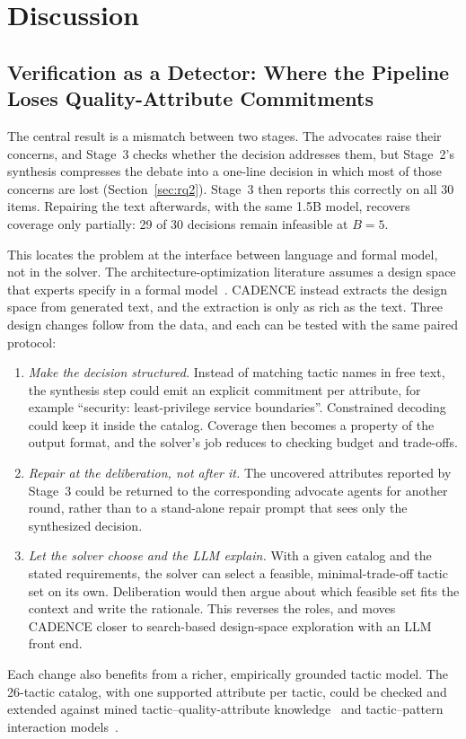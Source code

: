 \documentclass[preprint,12pt,authoryear]{elsarticle}
\renewcommand{\_}{\textunderscore\allowbreak{}}
\begin{document}
\section{Discussion}
\label{sec:discussion}

\subsection{Verification as a Detector: Where the Pipeline Loses Quality-Attribute Commitments}

The central result is a mismatch between two stages. The advocates raise their concerns, and Stage~3 checks whether the decision addresses them, but Stage~2's synthesis compresses the debate into a one-line decision in which most of those concerns are lost (Section~\ref{sec:rq2}). Stage~3 then reports this correctly on all 30 items. Repairing the text afterwards, with the same 1.5B model, recovers coverage only partially: 29 of 30 decisions remain infeasible at $B=5$.

This locates the problem at the interface between language and formal model, not in the solver. The architecture-optimization literature assumes a design space that experts specify in a formal model~\citep{aleti2013,martens2010,koziolek2011peropteryx}. CADENCE instead extracts the design space from generated text, and the extraction is only as rich as the text. Three design changes follow from the data, and each can be tested with the same paired protocol:
\begin{enumerate}[leftmargin=*]
\item \emph{Make the decision structured.} Instead of matching tactic names in free text, the synthesis step could emit an explicit commitment per attribute, for example ``security: least-privilege service boundaries''. Constrained decoding could keep it inside the catalog. Coverage then becomes a property of the output format, and the solver's job reduces to checking budget and trade-offs.
\item \emph{Repair at the deliberation, not after it.} The uncovered attributes reported by Stage~3 could be returned to the corresponding advocate agents for another round, rather than to a stand-alone repair prompt that sees only the synthesized decision.
\item \emph{Let the solver choose and the LLM explain.} With a given catalog and the stated requirements, the solver can select a feasible, minimal-trade-off tactic set on its own. Deliberation would then argue about which feasible set fits the context and write the rationale. This reverses the roles, and moves CADENCE closer to search-based design-space exploration with an LLM front end.
\end{enumerate}
Each change also benefits from a richer, empirically grounded tactic model. The 26-tactic catalog, with one supported attribute per tactic, could be checked and extended against mined tactic--quality-attribute knowledge~\citep{bi2021} and tactic--pattern interaction models~\citep{harrison2010,marquez2023}.
\end{document}
